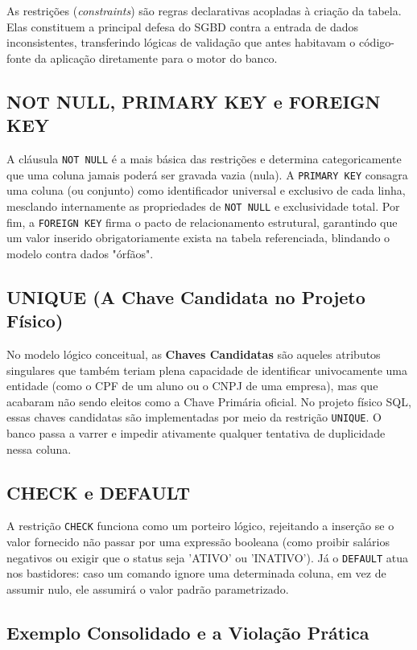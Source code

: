As restrições (\textit{constraints}) são regras declarativas acopladas à criação da tabela. Elas constituem a principal defesa do SGBD contra a entrada de dados inconsistentes, transferindo lógicas de validação que antes habitavam o código-fonte da aplicação diretamente para o motor do banco.

\subsection{NOT NULL, PRIMARY KEY e FOREIGN KEY}

A cláusula \texttt{NOT NULL} é a mais básica das restrições e determina categoricamente que uma coluna jamais poderá ser gravada vazia (nula). A \texttt{PRIMARY KEY} consagra uma coluna (ou conjunto) como identificador universal e exclusivo de cada linha, mesclando internamente as propriedades de \texttt{NOT NULL} e exclusividade total. Por fim, a \texttt{FOREIGN KEY} firma o pacto de relacionamento estrutural, garantindo que um valor inserido obrigatoriamente exista na tabela referenciada, blindando o modelo contra dados "órfãos".

\subsection{UNIQUE (A Chave Candidata no Projeto Físico)}

No modelo lógico conceitual, as \textbf{Chaves Candidatas} são aqueles atributos singulares que também teriam plena capacidade de identificar univocamente uma entidade (como o CPF de um aluno ou o CNPJ de uma empresa), mas que acabaram não sendo eleitos como a Chave Primária oficial. No projeto físico SQL, essas chaves candidatas são implementadas por meio da restrição \texttt{UNIQUE}. O banco passa a varrer e impedir ativamente qualquer tentativa de duplicidade nessa coluna.

\subsection{CHECK e DEFAULT}

A restrição \texttt{CHECK} funciona como um porteiro lógico, rejeitando a inserção se o valor fornecido não passar por uma expressão booleana (como proibir salários negativos ou exigir que o status seja 'ATIVO' ou 'INATIVO'). Já o \texttt{DEFAULT} atua nos bastidores: caso um comando ignore uma determinada coluna, em vez de assumir nulo, ele assumirá o valor padrão parametrizado.

\subsection{Exemplo Consolidado e a Violação Prática}

